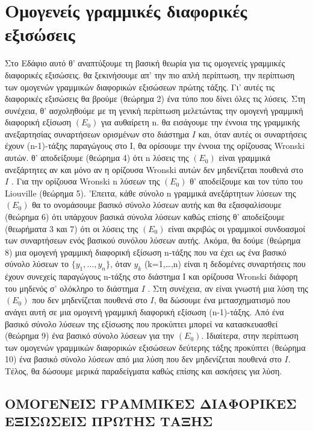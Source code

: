 \documentclass[11pt,a4paper,twoside]{book}
\newcommand{\eng}[1]{\selectlanguage{english}#1\selectlanguage{greek}}
\begin{document}
\section{Ομογενείς γραμμικές διαφορικές εξισώσεις}
Στο Εδάφιο αυτό θ' αναπτύξουμε τη βασική θεωρία για τις ομογενείς γραμμικές διαφορικές εξισώσεις. θα ξεκινήσουμε απ' την πιο απλή περίπτωση, την περίπτωση των ομογενών γραμμικών διαφορικών εξισώσεων πρώτης τάξης. Γι' αυτές τις διαφορικές εξισώσεις θα βρούμε (θεώρημα 2) ένα τύπο που δίνει όλες τις λύσεις. Στη συνέχεια, θ' ασχοληθούμε με τη γενική περίπτωση μελετώντας την ομογενή γραμμική διαφορική εξίσωση $(E_0)$ για αυθαίρετη n. θα εισάγουμε την έννοια της γραμμικής ανεξαρτησίας συναρτήσεων ορισμένων στο διάστημα $Ι$ και, όταν αυτές οι συναρτήσεις έχουν (n-1)-τάξης παραγώγους στο Ι, θα ορίσουμε την έννοια της ορίζουσας \eng{Wronski} αυτών. θ' αποδείξουμε (θεώρημα 4) ότι n λύσεις της $(E_0)$ είναι γραμμικά ανεξάρτητες αν και μόνο αν η ορίζουσα Wronski αυτών δεν μηδενίζεται πουθενά στο $I$ . Για την ορίζουσα \eng{Wronski} n λύσεων της $(E_0)$ θ' αποδείξουμε και τον τύπο του Liouville (θεώρημα 5). 'Επειτα, κάθε σύνολο n γραμμικά ανεξάρτητων λύσεων της $(E_0)$ θα το ονομάσουμε βασικό σύνολο λύσεων αυτής και θα εξασφαλίσουμε (θεώρημα 6) ότι υπάρχουν βασικά σύνολα λύσεων καθώς επίσης θ' αποδείξουμε (θεωρήματα 3 και 7) ότι οι λύσεις της $(E_0)$ είναι ακριβώς οι γραμμικοί συνδυασμοί των συναρτήσεων ενός βασικού συνόλου λύσεων αυτής. Ακόμα, θα δούμε (θεώρημα 8) μια ομογενή γραμμική διαφορική εξίσωση n-τάξης που να έχει ως ένα βασικό σύνολο λύσεων το $\{y_1, \dots, y_n\}$, όταν $y_k$ (k=1,\dots,n) είναι η δεδομένες συναρτήσεις που έχουν συνεχείς παραγώγους n-τάξης στο διάστημα Ι και ορίζουσα \eng{Wronski} διάφορη του μηδενός σ' ολόκληρο το διάστημα $I$ . Στη συνέχεια, αν είναι γνωστή μια λύση της $(E_0)$ που δεν μηδενίζεται πουθενά στο $Ι$, θα δώσουμε ένα μετασχηματισμό που ανάγει αυτή σε μια ομογενή γραμμική διαφορική εξίσωση (n-1)-τάξης. Από ένα βασικό σύνολο λύσεων της εξίσωσης που προκύπτει μπορεί να κατασκευασθεί (θεώρημα 9) ένα βασικό σύνολο λύσεων για την $(E_0)$. Ιδιαίτερα, στην περίπτωση των ομογενών γραμμικών διαφορικών εξισώσεων δεύτερης τάξης προκύπτει (θεώρημα 10) ένα βασικό σύνολο λύσεων από μια λύση που δεν μηδενίζεται πουθενά στο $Ι$. Τέλος, θα δώσουμε μερικά παραδείγματα καθώς επίσης και ασκήσεις για λύση.
\subsection{ΟΜΟΓΕΝΕΙΣ ΓΡΑΜΜΙΚΕΣ ΔΙΑΦΟΡΙΚΕΣ ΕΞΙΣΩΣΕΙΣ ΠΡΩΤΗΣ ΤΑΞΗΣ}
\end{document}
